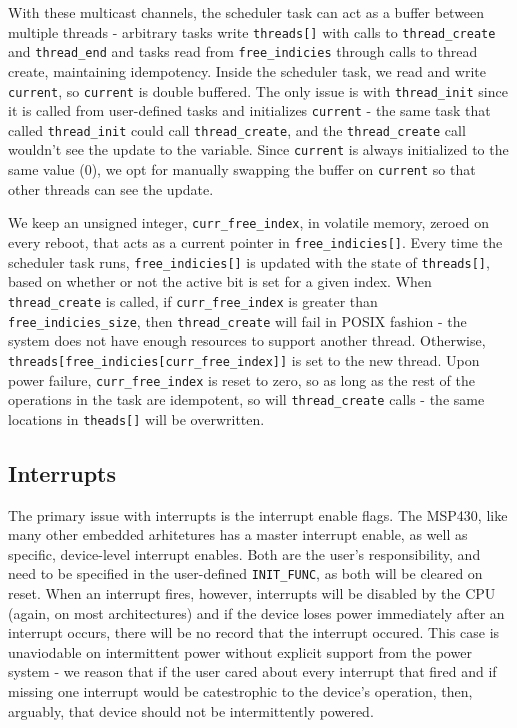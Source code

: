 \documentclass[11pt]{sensys-proc}
\begin{document}
With these multicast channels, the scheduler task can act as a buffer between
multiple threads - arbitrary tasks write \texttt{threads[]} with calls to
\texttt{thread\_create} and \texttt{thread\_end} and tasks read from
\texttt{free\_indicies} through calls to thread create, maintaining
idempotency. Inside the scheduler task, we read and write \texttt{current},
so \texttt{current} is double buffered. The only issue is with
\texttt{thread\_init} since it is called from user-defined tasks and
initializes \texttt{current} - the same task that called \texttt{thread\_init}
could call \texttt{thread\_create}, and the \texttt{thread\_create} call
wouldn't see the update to the variable. Since \texttt{current} is always
initialized to the same value (0), we opt for manually swapping the buffer on
\texttt{current} so that other threads can see the update.


We keep an unsigned integer, \texttt{curr\_free\_index}, in volatile memory,
zeroed on every reboot, that acts as a current pointer in
\texttt{free\_indicies[]}. Every time the scheduler task runs,
\texttt{free\_indicies[]} is updated with the state of \texttt{threads[]},
based on whether or not the active bit is set for a given index. When
\texttt{thread\_create} is called, if \texttt{curr\_free\_index} is greater
than \texttt{free\_indicies\_size}, then \texttt{thread\_create} will fail in
POSIX fashion - the system does not have enough resources to support another
thread. Otherwise, \texttt{threads[free\_indicies[curr\_free\_index]]} is set
to the new thread. Upon power failure, \texttt{curr\_free\_index} is reset to
zero, so as long as the rest of the operations in the task are idempotent, so
will \texttt{thread\_create} calls - the same locations in \texttt{theads[]}
will be overwritten.



\subsection{Interrupts}
The primary issue with interrupts is the interrupt enable flags. The MSP430,
like many other embedded arhitetures has a master interrupt enable,
as well as specific, device-level interrupt enables. Both are the user's
responsibility, and need to be specified in the user-defined
\texttt{INIT\_FUNC}, as both will be cleared on reset. When an interrupt fires,
however, interrupts will be disabled by the CPU (again, on most architectures)
and if the device loses power immediately after an interrupt occurs, there will
be no record that the interrupt occured. This case is unaviodable on
intermittent power without explicit support from the power system - we reason
that if the user cared about every interrupt that fired and if missing one
interrupt would be catestrophic to the device's operation, then, arguably, that
device should not be intermittently powered.
\end{document}
